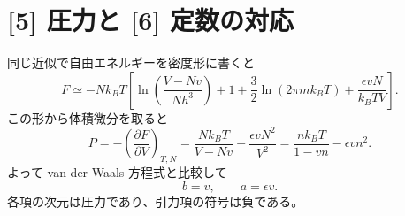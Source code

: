 \documentclass[11pt,a4paper]{article}
\begin{document}
\section*{[5] 圧力と [6] 定数の対応}
同じ近似で自由エネルギーを密度形に書くと
\begin{equation}
 F\simeq -Nk_BT\left[\ln\!\left(\frac{V-Nv}{Nh^3}\right)+1
 +\frac32\ln(2\pi mk_BT)+\frac{\epsilon vN}{k_BTV}\right].
\end{equation}
この形から体積微分を取ると
\begin{equation}
 P=-\left(\frac{\partial F}{\partial V}\right)_{T,N}
 =\frac{Nk_BT}{V-Nv}-\frac{\epsilon vN^2}{V^2}
 =\boxed{\frac{nk_BT}{1-vn}-\epsilon v n^2}.
\end{equation}
よって van der Waals 方程式と比較して
\begin{equation}
 \boxed{b=v,\qquad a=\epsilon v}.
\end{equation}
各項の次元は圧力であり、引力項の符号は負である。
\end{document}
